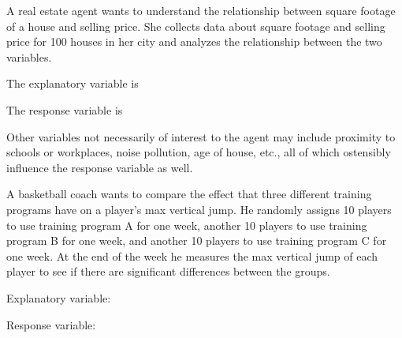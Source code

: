 \documentclass{ximera}
\begin{document}
\begin{example}
A real estate agent wants to understand the relationship between square footage of a house and selling price. She collects data about square footage and selling price for 100 houses in her city and analyzes the relationship between the two variables.

\begin{problem}
\begin{question}
The explanatory variable is
\begin{multipleChoice}
\end{multipleChoice}
\end{question}
\begin{question}
The response variable is
\begin{multipleChoice}
\end{multipleChoice}
\end{question}
\end{problem}

Other variables not necessarily of interest to the agent may include proximity to schools or workplaces, noise pollution, age of house, etc., all of which ostensibly influence the response variable as well.
\end{example}

\begin{example}
A basketball coach wants to compare the effect that three different training programs have on a player's max vertical jump. He randomly assigns 10 players to use training program A for one week, another 10 players to use training program B for one week, and another 10 players to use training program C for one week. At the end of the week he measures the max vertical jump of each player to see if there are significant differences between the groups.

\begin{problem}
\begin{question}
Explanatory variable:
\begin{multipleChoice}
\end{multipleChoice}
\end{question}
\begin{question}
Response variable:
\begin{multipleChoice}
\end{multipleChoice}
\end{question}
\end{problem}
\end{example}
\end{document}
